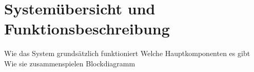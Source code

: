 \section{Systemübersicht und Funktionsbeschreibung} 
Wie das System grundsätzlich funktioniert
Welche Hauptkomponenten es gibt
Wie sie zusammenspielen
Blockdiagramm